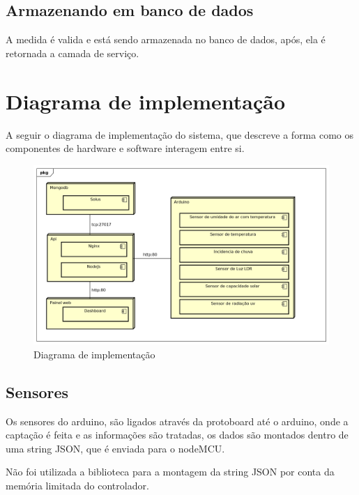 \section{Armazenando em banco de dados}

A medida é valida e está sendo armazenada no banco de dados, após, ela é retornada a camada de serviço.

\chapter{Diagrama de implementação}

A seguir o diagrama de implementação do sistema, que descreve a forma como os componentes de hardware e software interagem entre si.

\begin{figure}[H]
    \label{figure_diagrama_implementacao}
    \centering
    \caption{Diagrama de implementação}
    \includegraphics[scale=0.6]{diagrams/implementacao.png}
    \hfill
\end{figure}

\section{Sensores}

Os sensores do arduino, são ligados através da protoboard até o arduino, onde a captação é feita e as informações são tratadas, os dados são montados dentro de uma string JSON, que é enviada para o nodeMCU.

Não foi utilizada a biblioteca para a montagem da string JSON por conta da memória limitada do controlador.

